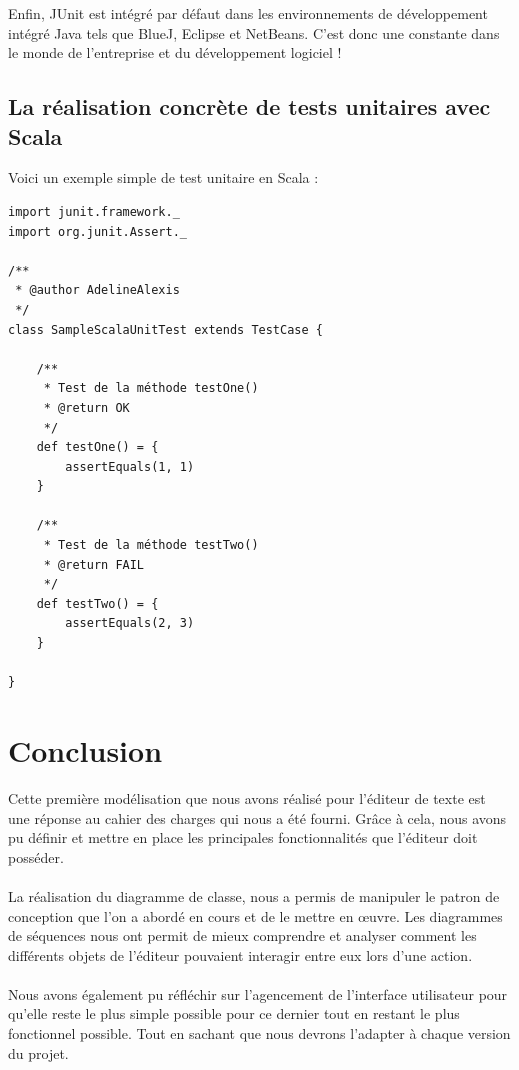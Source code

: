 \documentclass[a4paper,11pt]{article}
\begin{document}
Enfin, JUnit est intégré par défaut dans les environnements de développement intégré Java tels que BlueJ, Eclipse et NetBeans. C'est donc une constante dans le monde de l'entreprise et du développement logiciel !


\subsection{La réalisation concrète de tests unitaires avec Scala}

Voici un exemple simple de test unitaire en Scala :

\newpage
\begin{lstlisting}[caption=Exemple de TU Scala, label=java]
import junit.framework._
import org.junit.Assert._

/**
 * @author AdelineAlexis
 */
class SampleScalaUnitTest extends TestCase {

	/**
	 * Test de la méthode testOne()
	 * @return OK
	 */
	def testOne() = {
		assertEquals(1, 1)
	}

	/**
	 * Test de la méthode testTwo()
	 * @return FAIL
	 */
	def testTwo() = {
		assertEquals(2, 3)
	}

}

\end{lstlisting}	




\newpage
\section{Conclusion}
Cette première modélisation que nous avons réalisé pour l'éditeur de texte est une réponse au cahier des charges qui nous a été fourni. Grâce à cela, nous avons pu définir et mettre en place les principales fonctionnalités que l'éditeur doit posséder. 

\paragraph{}
La réalisation du diagramme de classe, nous a permis de manipuler le patron de conception que l'on a abordé en cours et de le mettre en œuvre. Les diagrammes de séquences nous ont permit de mieux comprendre et analyser comment les différents objets de l'éditeur pouvaient interagir entre eux lors d'une action. 

\paragraph{}
Nous avons également pu réfléchir sur l'agencement de l'interface utilisateur pour qu'elle reste le plus simple possible pour ce dernier tout en restant le plus fonctionnel possible. Tout en sachant que nous devrons l'adapter à chaque version du projet. 
\end{document}
